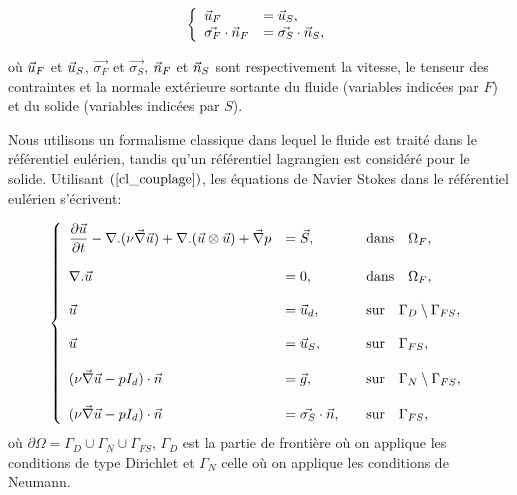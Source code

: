 \begin{equation}
  \left\{
\begin{array}{ll}
\velocity_F &= \velocity_S,\\
\vec{\sigma_F} \cdot \normal_F &= \vec{\sigma_S} \cdot \normal_S,
\end{array}
\right.
\label{cl_couplage}
\end{equation}

o\`u $\velocity_F$ et $\velocity_S$, $\vec{\sigma_F}$ et $\vec{\sigma_S}$, $\normal_F$ et $\normal_S$ sont respectivement la vitesse, le tenseur des contraintes et la normale ext\'erieure sortante  du fluide (variables indic\'ees par $F$) et du solide (variables indic\'ees par $S$).

Nous utilisons un formalisme classique dans lequel le fluide est trait\'e dans le r\'ef\'erentiel eul\'erien, tandis qu'un r\'ef\'erentiel lagrangien est consid\'er\'e pour le solide. Utilisant $(\ref{cl_couplage})$, les \'equations de Navier Stokes dans le r\'ef\'erentiel eul\'erien s'\'ecrivent:

\begin{equation}
  \left\{
\begin{array}{lll}
\ds{\frac{\partial \velocity}{\partial t} -\nabla. (\nu \vect{\nabla} \velocity) + \nabla. (\velocity  \otimes \velocity ) + \vect{\nabla}p }&=\vect{S},& \quad \text{dans}\quad \Omega_F, \\
\\
\ds{\nabla. \velocity }&= 0,& \quad \text{dans}\quad \Omega_F, \\
\\
\ds{\velocity }&= \velocity_d,& \quad \text{sur}\quad \Gamma_D \setminus \Gamma_{FS}, \\
\\
\ds{\velocity} &= \velocity_S,& \quad \text{sur}\quad  \Gamma_{FS}, \\
\\
\ds{(\nu \vect{\nabla} \velocity -p I_d)\cdot \normal  }&= \vec{ g},& \quad \text{sur}\quad \Gamma_N \setminus \Gamma_{FS},\\
\\
\ds{(\nu \vect{\nabla} \velocity -p I_d)\cdot \normal } &=  \vec{\sigma_S} \cdot \normal,& \quad \text{sur}\quad  \Gamma_{FS},
\end{array}
\right.
\label{eq:NS}
\end{equation}
o\`u $\partial \Omega = \Gamma_D \cup \Gamma_N \cup \Gamma_{FS}$, $\Gamma_D$ est la partie de fronti\`ere o\`u on applique les conditions de type Dirichlet et $\Gamma_N$ celle o\`u on applique les conditions de Neumann.


